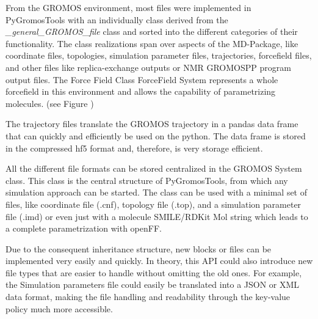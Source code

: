 

From the GROMOS environment, most files were implemented in PyGromosTools with an individually class derived from the \textit{\_general\_GROMOS\_file} class and sorted into the different categories of their functionality.
The class realizations span over aspects of the MD-Package, like coordinate files, topologies, simulation parameter files, trajectories, forcefield files, and other files like replica-exchange outputs or NMR GROMOSPP program output files. The Force Field Class ForceField System represents a whole forcefield in this environment and allows the capability of parametrizing molecules. (see Figure \label{subFig-FilesinModule})

The trajectory files translate the GROMOS trajectory in a pandas data frame that can quickly and efficiently be used on the python. The data frame is stored in the compressed hf5 format and, therefore, is very storage efficient.

All the different file formats can be stored centralized in the GROMOS System class. This class is the central structure of PyGromosTools, from which any simulation approach can be started. The class can be used with a minimal set of files, like coordinate file (.cnf), topology file (.top), and a simulation parameter file (.imd) or even just with a molecule SMILE/RDKit Mol string which leads to a complete parametrization with openFF.



Due to the consequent inheritance structure, new blocks or files can be implemented very easily and quickly. 
In theory, this API could also introduce new file types that are easier to handle without omitting the old ones. For example, the Simulation parameters file could easily be translated into a JSON or XML data format, making the file handling and readability through the key-value policy much more accessible.

